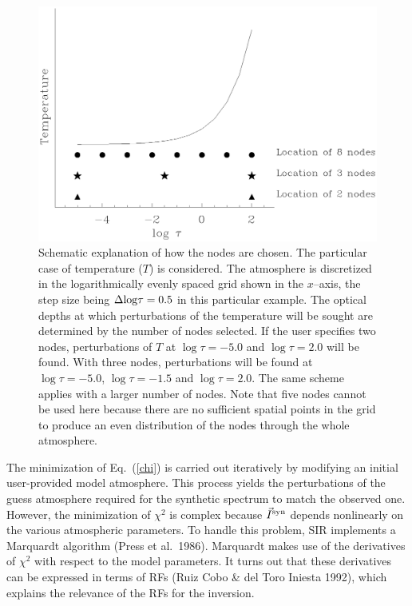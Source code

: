 \begin{figure}[h!]
\begin{center}
\includegraphics[width=140mm]{nodos_new.eps}
\caption[]{Schematic explanation of how the nodes are chosen. The
particular case of temperature ($T$) is considered. The atmosphere is
discretized in the logarithmically evenly spaced grid shown in the
$x$--axis, the step size being $\Delta {\rm log} \tau = 0.5$ in this
particular example. The optical depths at which perturbations of the
temperature will be sought are determined by the number of nodes
selected.  If the user specifies two nodes, perturbations of $T$ at
$\log \tau = -5.0$ and $\log \tau = 2.0$ will be found. With three
nodes, perturbations will be found at $\log \tau = -5.0$, $\log \tau =
-1.5$ and $\log \tau = 2.0$. The same scheme applies with a larger
number of nodes.  Note that five nodes cannot be used here because
there are no sufficient spatial points in the grid to produce an even
distribution of the nodes through the whole atmosphere.
 \label{nodosfig}}
\end{center}
\end{figure}


The minimization of Eq.\ (\ref{chi}) is carried out iteratively by
modifying an initial user-provided model atmosphere. This process
yields the perturbations of the guess atmosphere required for the
synthetic spectrum to match the observed one. However, the minimization
of $\chi^2$ is complex because $\vec{I}^{\rm syn}$ depends nonlinearly
on the various atmospheric parameters. To handle this problem, SIR
implements a Marquardt algorithm (Press et al.\ 1986).  Marquardt makes
use of the derivatives of $\chi^2$ with respect to the model
parameters. It turns out that these derivatives can be expressed in
terms of RFs (Ruiz Cobo \& del Toro Iniesta 1992), which explains the
relevance of the RFs for the inversion.

